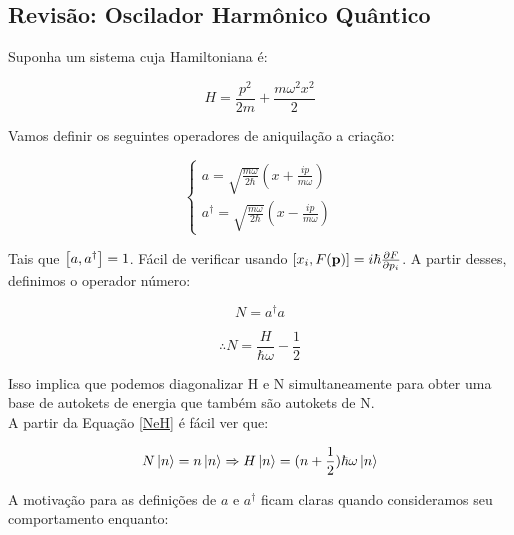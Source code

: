 \documentclass[12pt,a4paper]{report}
\begin{document}
\subsection{Revisão: Oscilador Harmônico Quântico}\label{quantum.harmonic.oscillator}

Suponha um sistema cuja Hamiltoniana é:

\begin{equation}
    H=\frac{p^2}{2m}+\frac{m\omega^2x^2}{2}
\end{equation}

Vamos definir os seguintes operadores de aniquilação a criação:

\begin{equation}
    \begin{cases}
        a=\sqrt{\frac{m\omega}{2\hbar}}(x+\frac{ip}{m\omega}) \\[0.3cm]
        a^{\dag}=\sqrt{\frac{m\omega}{2\hbar}}(x-\frac{ip}{m\omega})
    \end{cases}
\end{equation}

Tais que $\comm{a}{a^{\dag}}=1$. Fácil de verificar usando $\comm{x_i}{F(\textbf{p})}=i\hbar\frac{\partial{F}}{\partial{p_i}}$. A partir desses, definimos o operador número:

\begin{equation}
    N=a^{\dag}a
\end{equation}

\begin{equation}
    \therefore N=\frac{H}{\hbar\omega}-\frac{1}{2}
    \label{NeH}
\end{equation}

Isso implica que podemos diagonalizar H e N simultaneamente para obter uma base de autokets de energia que também são autokets de N.\\

A partir da Equação \ref{NeH} é fácil ver que:

\begin{equation*}
    N\ket{n}=n\ket{n} \Rightarrow H\ket{n}=(n+\frac{1}{2})\hbar\omega\ket{n}
\end{equation*}

A motivação para as definições de $a$ e $a^{\dag}$ ficam claras quando consideramos seu comportamento enquanto:
\end{document}

